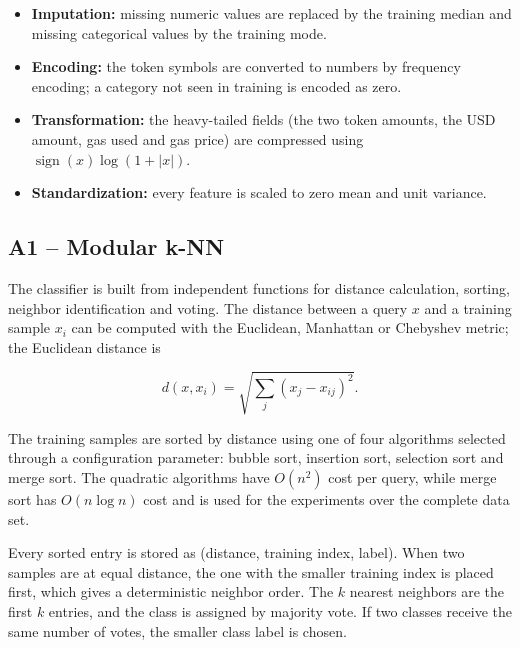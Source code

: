 \documentclass[conference]{IEEEtran}
\begin{document}
\begin{itemize}

\item \textbf{Imputation:} missing numeric values are replaced by the training median and missing categorical values by the training mode.

\item \textbf{Encoding:} the token symbols are converted to numbers by frequency encoding; a category not seen in training is encoded as zero.

\item \textbf{Transformation:} the heavy-tailed fields (the two token amounts, the USD amount, gas used and gas price) are compressed using $\operatorname{sign}(x)\log(1+|x|)$.

\item \textbf{Standardization:} every feature is scaled to zero mean and unit variance.

\end{itemize}

\subsection{A1 -- Modular k-NN}

The classifier is built from independent functions for distance calculation, sorting, neighbor identification and voting. The distance between a query $x$ and a training sample $x_i$ can be computed with the Euclidean, Manhattan or Chebyshev metric; the Euclidean distance is

\begin{equation}
d(x,x_i)=\sqrt{\sum_{j}(x_j-x_{ij})^2}.
\end{equation}

The training samples are sorted by distance using one of four algorithms selected through a configuration parameter: bubble sort, insertion sort, selection sort and merge sort. The quadratic algorithms have $O(n^2)$ cost per query, while merge sort has $O(n\log n)$ cost and is used for the experiments over the complete data set.

Every sorted entry is stored as (distance, training index, label). When two samples are at equal distance, the one with the smaller training index is placed first, which gives a deterministic neighbor order. The $k$ nearest neighbors are the first $k$ entries, and the class is assigned by majority vote. If two classes receive the same number of votes, the smaller class label is chosen.
\end{document}
